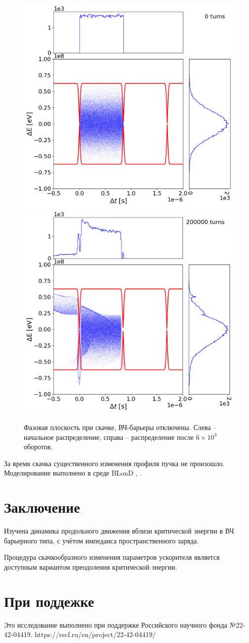 \documentclass[a4paper,
               keeplastbox,   %
               ]{jacow}
\begin{document}
\begin{figure}[!h]
   \includegraphics*[width=.49\columnwidth]{img/fig_08-1}
   \includegraphics*[width=.49\columnwidth]{img/fig_08-2}
   \caption{Фазовая плоскость при скачке, ВЧ-барьеры отключены. Слева – начальное распределение, справа – распределение после $6\times{10}^3$ оборотов.}
   \label{fig:3}
\end{figure}

\par За время скачка существенного изменения профиля пучка не произошло. Моделирование выполнено в среде BLonD \cite{blond_mod}, \cite{blond}.

\section{Заключение}

\par Изучена динамика продольного движения вблизи критической энергии в ВЧ барьерного типа, с учётом импеданса пространственного заряда.  
\par Процедура скачкообразного изменения параметров ускорителя является доступным вариантом преодоления критической энергии.

\section{При поддежке}
Это исследование выполнено при поддержке Российского научного фонда №22-42-04419. https://rscf.ru/en/project/22-42-04419/
\end{document}
